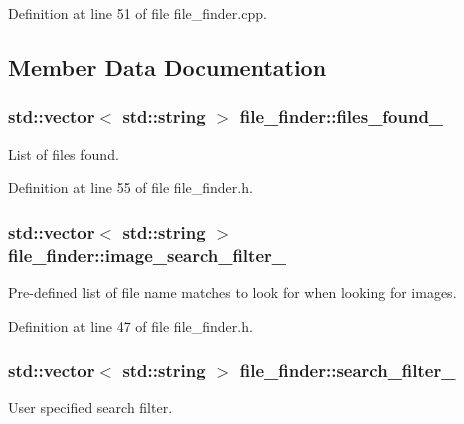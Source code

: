 Definition at line 51 of file file\+\_\+finder.\+cpp.



\subsection{Member Data Documentation}
\subsubsection[{\texorpdfstring{files\+\_\+found\+\_\+}{files_found_}}]{\setlength{\rightskip}{0pt plus 5cm}std\+::vector$<$ std\+::string $>$ file\+\_\+finder\+::files\+\_\+found\+\_\+\hspace{0.3cm}{\ttfamily [static]}}\hypertarget{classfile__finder_a40b67eabc93b35b47a4e32ad5146cc48}{}\label{classfile__finder_a40b67eabc93b35b47a4e32ad5146cc48}
List of files found. 

Definition at line 55 of file file\+\_\+finder.\+h.

\subsubsection[{\texorpdfstring{image\+\_\+search\+\_\+filter\+\_\+}{image_search_filter_}}]{\setlength{\rightskip}{0pt plus 5cm}std\+::vector$<$ std\+::string $>$ file\+\_\+finder\+::image\+\_\+search\+\_\+filter\+\_\+\hspace{0.3cm}{\ttfamily [static]}}\hypertarget{classfile__finder_ac566ab0ab5d5f4a7352f3394a7ae298d}{}\label{classfile__finder_ac566ab0ab5d5f4a7352f3394a7ae298d}
Pre-\/defined list of file name matches to look for when looking for images. 

Definition at line 47 of file file\+\_\+finder.\+h.

\subsubsection[{\texorpdfstring{search\+\_\+filter\+\_\+}{search_filter_}}]{\setlength{\rightskip}{0pt plus 5cm}std\+::vector$<$ std\+::string $>$ file\+\_\+finder\+::search\+\_\+filter\+\_\+\hspace{0.3cm}{\ttfamily [static]}}\hypertarget{classfile__finder_a407cee5bc1d68cc81e8ea0bef8f15eda}{}\label{classfile__finder_a407cee5bc1d68cc81e8ea0bef8f15eda}
User specified search filter. 

